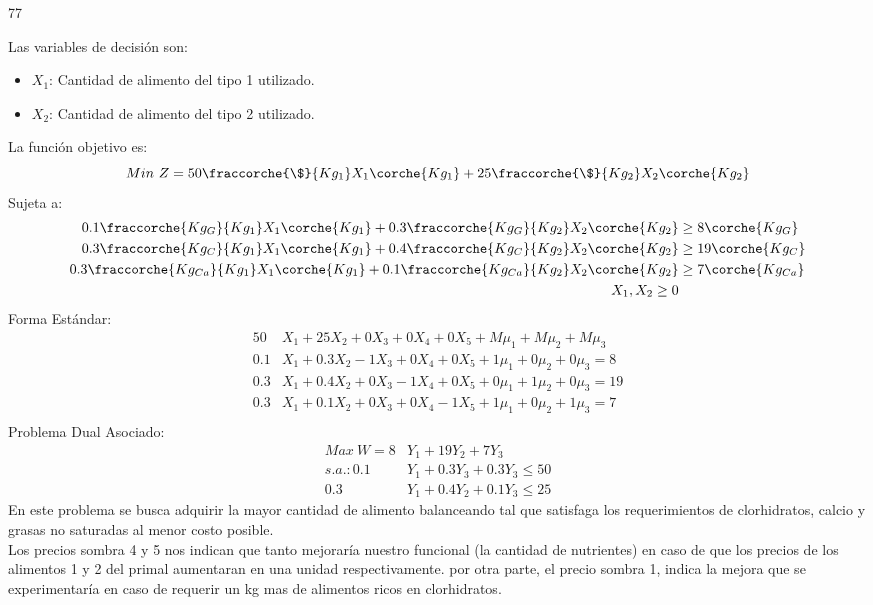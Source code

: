 77
\begin{homeworkProblem}
Las variables de decisión son:
\begin{itemize}
	\item $X_1$: Cantidad de alimento del tipo 1 utilizado.
	\item $X_2$: Cantidad de alimento del tipo 2 utilizado.
\end{itemize}
La función objetivo es: 
\begin{equation}
	Min\ Z = 50\fraccorche{\$}{Kg_1}X_1\corche{Kg_1} + 25\fraccorche{\$}{Kg_2}X_2\corche{Kg_2}
\end{equation}
Sujeta a:
\begin{align*}
	0.1\fraccorche{Kg_{G}}{Kg_1}X_1\corche{Kg_1} + 0.3\fraccorche{Kg_{G}}{Kg_2}X_2\corche{Kg_2} &\ge 8\corche{Kg_{G}} \\
	0.3\fraccorche{Kg_{C}}{Kg_1}X_1\corche{Kg_1} + 0.4\fraccorche{Kg_{C}}{Kg_2}X_2\corche{Kg_2} &\ge 19\corche{Kg_{C}} \\
	0.3\fraccorche{Kg_{Ca}}{Kg_1}X_1\corche{Kg_1} + 0.1\fraccorche{Kg_{Ca}}{Kg_2}X_2\corche{Kg_2} &\ge 7\corche{Kg_{Ca}} \\
	X_1,X_2 \ge 0 
\end{align*}
Forma Estándar:
\begin{align*}
50&X_1 + 25X_2 + 0X_3 + 0X_4 + 0X_5 + M\mu_1 + M\mu_2 + M\mu_3 \\
0.1&X_1 + 0.3X_2 -1X_3 + 0X_4 + 0X_5 + 1\mu_1 + 0\mu_2 + 0\mu_3 = 8\\
0.3&X_1 + 0.4X_2 +0X_3 -1X_4 + 0X_5 + 0\mu_1 + 1\mu_2 + 0\mu_3 = 19\\
0.3&X_1 + 0.1X_2  +0X_3 + 0X_4 - 1X_5 + 1\mu_1 + 0\mu_2 + 1\mu_3 = 7\\
\end{align*}
Problema Dual Asociado:
\begin{align*}
    Max\ W = 8&Y_1 + 19Y_2 + 7Y_3 \\
    s.a.: 0.1&Y_1 + 0.3Y_3 + 0.3Y_3 \le 50 \\
    0.3&Y_1 + 0.4Y_2 + 0.1Y_3 \le 25 
\end{align*}
En este problema se busca adquirir la mayor cantidad de alimento balanceando tal que satisfaga los requerimientos de clorhidratos, calcio y grasas no saturadas al menor costo posible. \\
Los precios sombra 4 y 5 nos indican que tanto mejoraría nuestro funcional (la cantidad de nutrientes) en caso de que los precios de los alimentos 1 y 2 del primal aumentaran en una unidad respectivamente. por otra parte, el precio sombra 1, indica la mejora que se experimentaría en caso de requerir un kg mas de alimentos ricos en clorhidratos.
\end{homeworkProblem}